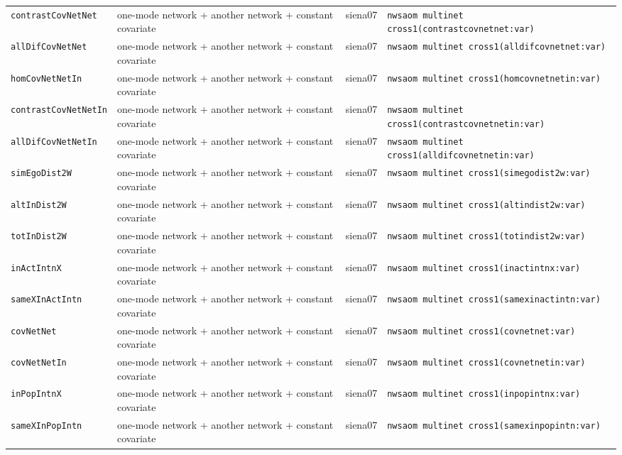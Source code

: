 \begin{longtable}{@{}p{2.6cm}p{3.2cm}p{2.9cm}p{5.4cm}@{}}
\texttt{contrastCovNetNet} & one-mode network + another network + constant covariate & siena07 & \texttt{nwsaom multinet cross1(contrastcovnetnet:var)}\\
\texttt{allDifCovNetNet} & one-mode network + another network + constant covariate & siena07 & \texttt{nwsaom multinet cross1(alldifcovnetnet:var)}\\
\texttt{homCovNetNetIn} & one-mode network + another network + constant covariate & siena07 & \texttt{nwsaom multinet cross1(homcovnetnetin:var)}\\
\texttt{contrastCovNetNetIn} & one-mode network + another network + constant covariate & siena07 & \texttt{nwsaom multinet cross1(contrastcovnetnetin:var)}\\
\texttt{allDifCovNetNetIn} & one-mode network + another network + constant covariate & siena07 & \texttt{nwsaom multinet cross1(alldifcovnetnetin:var)}\\
\texttt{simEgoDist2W} & one-mode network + another network + constant covariate & siena07 & \texttt{nwsaom multinet cross1(simegodist2w:var)}\\
\texttt{altInDist2W} & one-mode network + another network + constant covariate & siena07 & \texttt{nwsaom multinet cross1(altindist2w:var)}\\
\texttt{totInDist2W} & one-mode network + another network + constant covariate & siena07 & \texttt{nwsaom multinet cross1(totindist2w:var)}\\
\texttt{inActIntnX} & one-mode network + another network + constant covariate & siena07 & \texttt{nwsaom multinet cross1(inactintnx:var)}\\
\texttt{sameXInActIntn} & one-mode network + another network + constant covariate & siena07 & \texttt{nwsaom multinet cross1(samexinactintn:var)}\\
\texttt{covNetNet} & one-mode network + another network + constant covariate & siena07 & \texttt{nwsaom multinet cross1(covnetnet:var)}\\
\texttt{covNetNetIn} & one-mode network + another network + constant covariate & siena07 & \texttt{nwsaom multinet cross1(covnetnetin:var)}\\
\texttt{inPopIntnX} & one-mode network + another network + constant covariate & siena07 & \texttt{nwsaom multinet cross1(inpopintnx:var)}\\
\texttt{sameXInPopIntn} & one-mode network + another network + constant covariate & siena07 & \texttt{nwsaom multinet cross1(samexinpopintn:var)}\\

\end{longtable}

